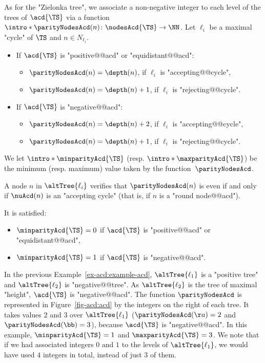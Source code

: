 \documentclass{theoretics}
\begin{document}
\AP As for the "Zielonka tree", we associate a non-negative integer to each level of the trees of $\acd{\TS}$ via a function $\intro*\parityNodesAcd(n)\colon \nodesAcd{\TS} \to \NN$. Let $\ell_i$ be a maximal "cycle" of $\TS$ and $n\in N_{\ell_i}$. 
\begin{itemize}
	\item If $\acd{\TS}$ is "positive@@acd" or "equidistant@@acd": 
	\begin{itemize}
		\item $\parityNodesAcd(n) = \depth(n)$, if $\ell_i$ is "accepting@@cycle",
		\item $\parityNodesAcd(n) = \depth(n) + 1$, if $\ell_i$ is "rejecting@@cycle".
	\end{itemize}
	\item If $\acd{\TS}$ is "negative@@acd":
	\begin{itemize}
		\item $\parityNodesAcd(n) = \depth(n)+2$, if $\ell_i$ is "accepting@@cycle",
		\item $\parityNodesAcd(n) = \depth(n) + 1$, if $\ell_i$ is "rejecting@@cycle".
	\end{itemize}
\end{itemize}
\AP We let $\intro*\minparityAcd{\TS}$ (resp. $\intro*\maxparityAcd{\TS}$) be the minimum (resp. maximum) value taken by the function~$\parityNodesAcd$. 

\begin{remark}\label{rmk-acd:parity_levels_ACD}
	A node $n$ in $\altTree{\ell_i}$ verifies that $\parityNodesAcd(n)$ is even if and only if $\nuAcd(n)$ is an "accepting cycle" (that is, if $n$ is a "round node@@acd").
\end{remark}

\begin{remark}
	It is satisfied:
	\begin{itemize}
		\item $\minparityAcd{\TS}=0$ if $\acd{\TS}$ is "positive@@acd" or "equidistant@@acd",
		\item $\minparityAcd{\TS}=1$ if $\acd{\TS}$ is "negative@@acd".
	\end{itemize}	 
\end{remark}

\begin{example}
	In the previous Example~\ref{ex-acd:example-acd}, $\altTree{\ell_1}$ is a "positive tree" and $\altTree{\ell_2}$ is  "negative@@tree". As $\altTree{\ell_2}$ is the tree of maximal "height",  $\acd{\TS}$ is "negative@@acd". 
	The function $\parityNodesAcd$ is represented in Figure~\ref{fig-acd:acd} by the integers on the right of each tree. It takes values $2$ and $3$ over $\altTree{\ell_1}$ ($\parityNodesAcd(\aa)=2$ and $\parityNodesAcd(\bb)=3$), because $\acd{\TS}$ is "negative@@acd". 
	In this example, $\minparityAcd{\TS}=1$ and $\maxparityAcd{\TS}=3$.
	We note that if we had associated integers $0$ and $1$ to the levels of $\altTree{\ell_1}$, we would have used $4$ integers in total, instead of just $3$ of them.		
\end{example}
\end{document}
